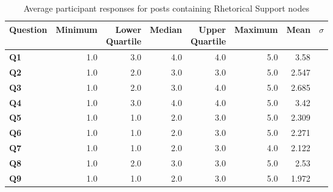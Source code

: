 \begin{table}
\centering
\caption{Average participant responses for posts containing Rhetorical Support nodes}
\label{table:perception:rhetorical-support-average}
\begin{tabular}{ l | r | r | r | r | r | r | r}
\textbf{Question} & \textbf{Minimum} & \pbox{2cm}{\textbf{Lower}\\ \textbf{Quartile}} & \textbf{Median} & \pbox{2cm}{\textbf{Upper}\\ \textbf{Quartile}} & \textbf{Maximum} & \textbf{Mean} & \textbf{$\sigma$}\\
\hline
\textbf{Q1} &  1.0 & 3.0 & 4.0 & 4.0 & 5.0 & 3.58 &  \\
\hline
\textbf{Q2} &  1.0 & 2.0 & 3.0 & 3.0 & 5.0 & 2.547 &  \\
\hline
\textbf{Q3} &  1.0 & 2.0 & 3.0 & 4.0 & 5.0 & 2.685 &  \\
\hline
\textbf{Q4} &  1.0 & 3.0 & 4.0 & 4.0 & 5.0 & 3.42 &  \\
\hline
\textbf{Q5} &  1.0 & 1.0 & 2.0 & 3.0 & 5.0 & 2.309 &  \\
\hline
\textbf{Q6} &  1.0 & 1.0 & 2.0 & 3.0 & 5.0 & 2.271 &  \\
\hline
\textbf{Q7} &  1.0 & 1.0 & 2.0 & 3.0 & 4.0 & 2.122 &  \\
\hline
\textbf{Q8} &  1.0 & 2.0 & 3.0 & 3.0 & 5.0 & 2.53 &  \\
\hline
\textbf{Q9} &  1.0 & 1.0 & 2.0 & 3.0 & 5.0 & 1.972 &  \\
\end{tabular}
\end{table}




